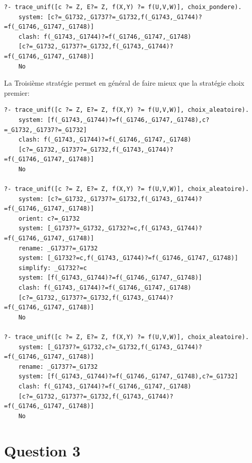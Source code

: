 \documentclass[10pt,a4paper]{report}
\begin{document}
\begin{lstlisting}[caption ={Stratégie choix pondere dans $main.pl$}]
?- trace_unif([c ?= Z, E?= Z, f(X,Y) ?= f(U,V,W)], choix_pondere).
	system: [c?=_G1732,_G1737?=_G1732,f(_G1743,_G1744)?=f(_G1746,_G1747,_G1748)]
	clash: f(_G1743,_G1744)?=f(_G1746,_G1747,_G1748)
	[c?=_G1732,_G1737?=_G1732,f(_G1743,_G1744)?=f(_G1746,_G1747,_G1748)]
	No
\end{lstlisting}

La Troisième stratégie permet en général de faire mieux que la stratégie choix premier:

\begin{lstlisting}[caption ={Stratégie choix pondere dans $main.pl$}]
?- trace_unif([c ?= Z, E?= Z, f(X,Y) ?= f(U,V,W)], choix_aleatoire).
	system: [f(_G1743,_G1744)?=f(_G1746,_G1747,_G1748),c?=_G1732,_G1737?=_G1732]
	clash: f(_G1743,_G1744)?=f(_G1746,_G1747,_G1748)
	[c?=_G1732,_G1737?=_G1732,f(_G1743,_G1744)?=f(_G1746,_G1747,_G1748)]
	No

?- trace_unif([c ?= Z, E?= Z, f(X,Y) ?= f(U,V,W)], choix_aleatoire).
	system: [c?=_G1732,_G1737?=_G1732,f(_G1743,_G1744)?=f(_G1746,_G1747,_G1748)]
	orient: c?=_G1732
	system: [_G1737?=_G1732,_G1732?=c,f(_G1743,_G1744)?=f(_G1746,_G1747,_G1748)]
	rename: _G1737?=_G1732
	system: [_G1732?=c,f(_G1743,_G1744)?=f(_G1746,_G1747,_G1748)]
	simplify: _G1732?=c
	system: [f(_G1743,_G1744)?=f(_G1746,_G1747,_G1748)]
	clash: f(_G1743,_G1744)?=f(_G1746,_G1747,_G1748)
	[c?=_G1732,_G1737?=_G1732,f(_G1743,_G1744)?=f(_G1746,_G1747,_G1748)]
	No

?- trace_unif([c ?= Z, E?= Z, f(X,Y) ?= f(U,V,W)], choix_aleatoire).
	system: [_G1737?=_G1732,c?=_G1732,f(_G1743,_G1744)?=f(_G1746,_G1747,_G1748)]
	rename: _G1737?=_G1732
	system: [f(_G1743,_G1744)?=f(_G1746,_G1747,_G1748),c?=_G1732]
	clash: f(_G1743,_G1744)?=f(_G1746,_G1747,_G1748)
	[c?=_G1732,_G1737?=_G1732,f(_G1743,_G1744)?=f(_G1746,_G1747,_G1748)]
	No

\end{lstlisting}

\mbox{}
\newpage
\chapter*{Question 3}
\end{document}
